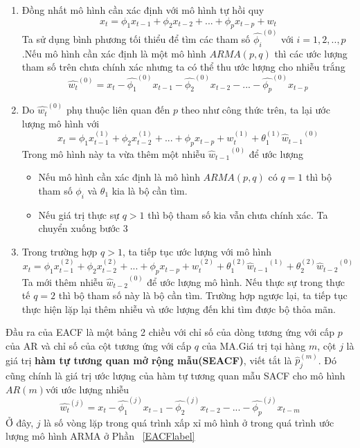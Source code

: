 \begin{enumerate}
\item Đồng nhất mô hình cần xác định với mô hình tự hồi quy
	\begin{equation}
		x_t = \phi_1x_{t-1}+\phi_2x_{t-2}+...+\phi_px_{t-p}+w_t
	\end{equation}
Ta sử dụng bình phương tối thiểu để tìm các tham số $\hat{\phi_i}^{(0)}$ với $i=1,2,..,p$.Nếu mô hình cần xác định là một mô hình $ARMA(p,q)$ thì các ước lượng tham số trên chưa chính xác nhưng ta có thể thu ước lượng cho nhiễu trắng
\begin{equation}
	\hat{w_t}^{(0)} = x_t - \hat{\phi_1}^{(0)}x_{t-1}-\hat{\phi_2}^{(0)}x_{t-2}-...-\hat{\phi_p}^{(0)}x_{t-p}
	\end{equation}
	\item Do $\hat{w_t}^{(0)}$ phụ thuộc liên quan đến $p$ theo như công thức trên, ta lại ước lượng mô hình với 
	\begin{equation}
		x_t = \phi_1x_{t-1}^{(1)}+\phi_2x_{t-2}^{(1)}+...+\phi_px_{t-p}+w_t^{(1)}+\theta_{1}^{(1)}{\hat{w}_{t-1}}^{(0)}
	\end{equation}
Trong mô hình này ta vừa thêm một nhiễu ${\hat{w}_{t-1}}^{(0)}$ để ước lượng
	\begin{itemize}
		\item Nếu mô hình cần xác định là mô hình $ARMA(p,q)$ có $q=1$ thì bộ tham số $\phi_i$ và $\theta_1$ kia là bộ cần tìm.
		\item Nếu giá trị thực sự $q>1$ thì bộ tham số kia vẫn chưa chính xác. Ta chuyển xuống bước 3
	\end{itemize}
\item Trong trường hợp $q>1$, ta tiếp tục ước lượng với mô hình 
	\begin{equation}
		x_t = \phi_1x_{t-1}^{(2)}+\phi_2x_{t-2}^{(2)}+...+\phi_px_{t-p}+w_t^{(2)}+\theta_{1}^{(2)}{\hat{w}_{t-1}}^{(1)} + \theta_{2}^{(2)}{\hat{w}_{t-2}}^{(0)}
	\end{equation}
	Ta mới thêm nhiễu ${\hat{w}_{t-2}}^{(0)}$ để ước lượng mô hình. Nếu thực sự trong thực tế $q=2$ thì bộ tham số này là bộ cần tìm. Trường hợp ngược lại, ta tiếp tục thực hiện lặp lại thêm nhiễu và ước lượng đến khi tìm được bộ thỏa mãn.
\end{enumerate}

Đầu ra của EACF là một bảng 2 chiều với chỉ số của dòng tương ứng với cấp $p$ của AR và chỉ số của cột tương ứng với cấp $q$ của MA.Giá trị tại hàng $m$, cột $j$ là giá trị \textbf{hàm tự tương quan mở rộng mẫu(SEACF)}, viết tắt là \textbf{$\hat{p}_j^{(m)}$}. Đó cũng chính là giá trị ước lượng của hàm tự tương quan mẫu SACF cho mô hình $AR(m)$với ước lượng nhiễu
\begin{equation}
	\hat{w_t}^{(j)} = x_t - \hat{\phi_1}^{(j)}x_{t-1}-\hat{\phi_2}^{(j)}x_{t-2}-...-\hat{\phi_p}^{(j)}x_{t-m}
\end{equation}
Ở đây, $j$ là số vòng lặp trong quá trình xấp xỉ mô hình ở trong quá trình ước lượng mô hình ARMA ở Phần ~\ref{EACFlabel}

